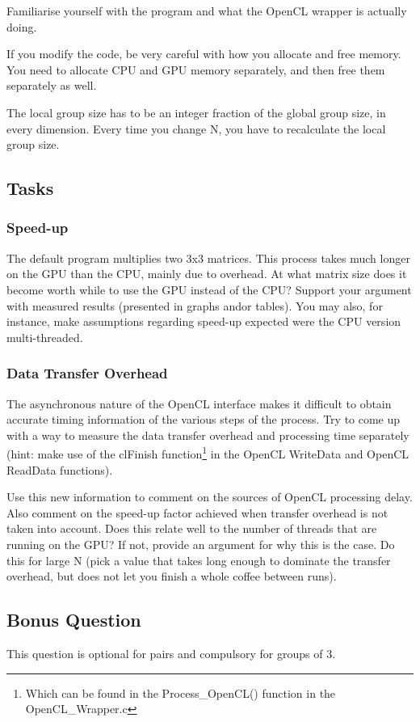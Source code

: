 Familiarise yourself with the program and what the OpenCL wrapper is actually doing. 

If you modify the code, be very careful with how you allocate and free memory. You need to allocate CPU and GPU memory separately, and then free them separately as well.

The local group size has to be an integer fraction of the global group size, in every dimension. Every time you change N, you have to recalculate the local group size. 

\subsection{Tasks}
\subsubsection{Speed-up}
The default program multiplies two 3x3 matrices. This process takes much longer on the GPU than the CPU, mainly due to overhead. At what matrix size does it become worth while to use the GPU instead of the CPU? Support your argument with measured results (presented in graphs and\/or tables). You may also, for instance, make assumptions regarding speed-up expected were the CPU version multi-threaded.

\subsubsection{Data Transfer Overhead}
The asynchronous nature of the OpenCL interface makes it difficult to obtain accurate timing information of the various steps of the process. Try to come up with a way to measure the data transfer overhead and processing time separately (hint: make use of the clFinish function\footnote{Which can be found in the Process\_OpenCL() function in the OpenCL\_Wrapper.c} in the OpenCL WriteData and OpenCL ReadData functions).

Use this new information to comment on the sources of OpenCL processing delay. Also comment on the speed-up factor achieved when transfer overhead is not taken into account. Does this relate well to the number of threads that are running on the GPU? If not, provide an argument for why this is the case. Do this for large N (pick a value that takes long enough to dominate the transfer overhead, but does not let you finish a whole coffee between runs).

\subsection{Bonus Question}
This question is optional for pairs and compulsory for groups of 3.

